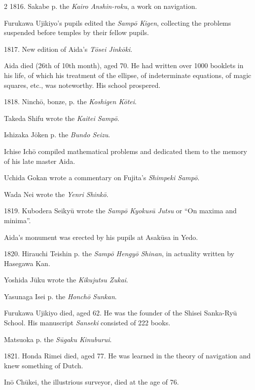 \documentclass[11pt]{article}
\newcommand{\scanfooter}{}
\begin{document}
\begin{multicols}{2}
1816. Sakabe p. the \emph{Kairo Anshin-roku}, a work on navigation.

Furukawa Ujikiyo's pupils edited the \emph{Sampō Kigen}, collecting the problems suspended before temples by their fellow pupils.

1817. New edition of Aida's \emph{Tōsei Jinkōki}.

Aida died (26th of 10th month), aged 70. He had written over 1000 booklets in his life, of which his treatment of the ellipse, of indeterminate equations, of magic squares, etc., was noteworthy. His school prospered.

1818. Ninchō, bonze, p. the \emph{Koshigen Kōtei}.

Takeda Shifu wrote the \emph{Kaitei Sampō}.

Ishizaka Jōken p. the \emph{Bundo Seizu}.

Ichise Ichō compiled mathematical problems and dedicated them to the memory of his late master Aida.

Uchida Gokan wrote a commentary on Fujita's \emph{Shimpeki Sampō}.

Wada Nei wrote the \emph{Yenri Shinkō}.

1819. Kubodera Seikyū wrote the \emph{Sampō Kyokusū Jutsu} or ``On maxima and minima''.

Aida's monument was erected by his pupils at Asakūsa in Yedo.

1820. Hirauchi Teishin p. the \emph{Sampō Hengyō Shinan}, in actuality written by Hasegawa Kan.

Yoshida Jūku wrote the \emph{Kikujutsu Zukai}.

Yasunaga Isei p. the \emph{Honchō Sunkan}.

Furukawa Ujikiyo died, aged 62. He was the founder of the Shisei Sanka-Ryū School. His manuscript \emph{Sanseki} consisted of 222 books.

Matsuoka p. the \emph{Sūgaku Kinuburui}.

1821. Honda Rimei died, aged 77. He was learned in the theory of navigation and knew something of Dutch.

Inō Chūkei, the illustrious surveyor, died at the age of 76.
\end{multicols}
\scanfooter
\end{document}
